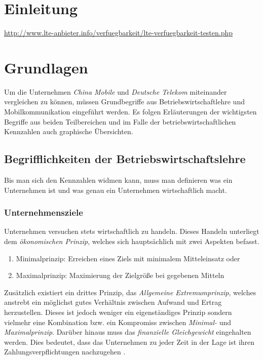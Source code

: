 \documentclass[12pt, a4paper]{article}
\begin{document}
\section{Einleitung}
\url{http://www.lte-anbieter.info/verfuegbarkeit/lte-verfuegbarkeit-testen.php}

\section{Grundlagen}
Um die Unternehmen \textit{China Mobile} und \textit{Deutsche Telekom} miteinander vergleichen zu können, müssen Grundbegriffe aus Betriebswirtschaftlehre und Mobilkommunikation eingeführt werden. Es folgen Erläuterungen der wichtigsten Begriffe aus beiden Teilbereichen und im Falle der betriebswirtschaftlichen Kennzahlen auch graphische Übersichten. 

\subsection{Begrifflichkeiten der Betriebswirtschaftslehre}
Bis man sich den Kennzahlen widmen kann, muss man definieren was ein Unternehmen ist und was genau ein Unternehmen wirtschaftlich macht.

\subsubsection{Unternehmensziele}

Unternehmen versuchen stets wirtschaftlich zu handeln. Dieses Handeln unterliegt dem \textit{ökonomischen Prinzip}, welches sich hauptsächlich mit zwei Aspekten befasst\cite{muller}.

\begin{enumerate}
\item Minimalprinzip: Erreichen eines Ziels mit minimalem Mitteleinsatz oder
\item Maximalprinzip: Maximierung der Zielgröße bei gegebenen Mitteln
\end{enumerate}

Zusätzlich existiert ein drittes Prinzip, das \textit{Allgemeine Extremumprinzip}, welches anstrebt ein möglichst gutes Verhältnis zwischen Aufwand und Ertrag herzustellen. Dieses ist jedoch weniger ein eigenständiges Prinzip sondern vielmehr eine Kombination bzw. ein Kompromiss zwischen  \textit{Minimal-} und \textit{Maximalprinzip}. Darüber hinaus muss das \textit{finanzielle Gleichgewicht} eingehalten werden. Dies bedeutet, dass das Unternehmen zu jeder Zeit in der Lage ist ihren Zahlungsverpflichtungen nachzugehen \cite{muller}.
\end{document}
